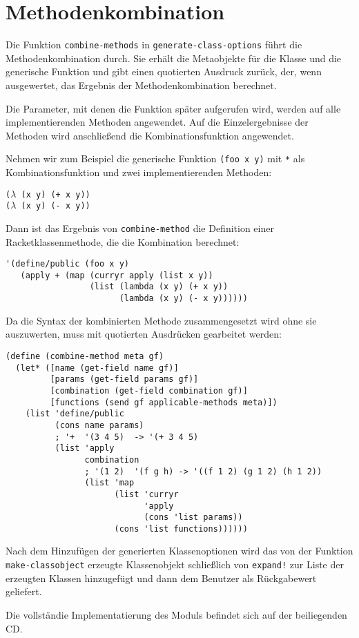 \section{Methodenkombination}
\label{combination-impl}
Die Funktion \texttt{combine-methods} in \texttt{generate-class-options} führt die Methodenkombination durch. Sie erhält die Metaobjekte für die Klasse und die generische Funktion und gibt einen quotierten Ausdruck zurück, der, wenn ausgewertet, das Ergebnis der Methodenkombination berechnet.

Die Parameter, mit denen die Funktion später aufgerufen wird, werden auf alle implementierenden Methoden angewendet. Auf die Einzelergebnisse der Methoden wird anschließend die Kombinationsfunktion angewendet.

Nehmen wir zum Beispiel die generische Funktion \texttt{(foo x y)} mit \texttt{*} als Kombinationsfunktion und zwei implementierenden Methoden:

\texttt{($\lambda$ (x y) (+ x y))\\
($\lambda$ (x y) (- x y))}

Dann ist das Ergebnis von \texttt{combine-method} die Definition einer Racketklassenmethode, die die Kombination berechnet:

\begin{lstlisting}
'(define/public (foo x y)
   (apply + (map (curryr apply (list x y))
                 (list (lambda (x y) (+ x y))
                       (lambda (x y) (- x y))))))
\end{lstlisting}

Da die Syntax der kombinierten Methode zusammengesetzt wird ohne sie auszuwerten, muss mit quotierten Ausdrücken gearbeitet werden:

\begin{lstlisting}
(define (combine-method meta gf)
  (let* ([name (get-field name gf)]
         [params (get-field params gf)]
         [combination (get-field combination gf)]
         [functions (send gf applicable-methods meta)])
    (list 'define/public
          (cons name params)
          ; '+  '(3 4 5)  -> '(+ 3 4 5)
          (list 'apply
                combination
                ; '(1 2)  '(f g h) -> '((f 1 2) (g 1 2) (h 1 2))
                (list 'map
                      (list 'curryr
                            'apply
                            (cons 'list params))
                      (cons 'list functions))))))
\end{lstlisting}

Nach dem Hinzufügen der generierten Klassenoptionen wird das von der Funktion \texttt{make-classobject} erzeugte Klassenobjekt schließlich von \texttt{expand!} zur Liste der erzeugten Klassen hinzugefügt und dann dem Benutzer als Rückgabewert geliefert. 

Die vollständie Implementatierung des Moduls befindet sich auf der beiliegenden CD.